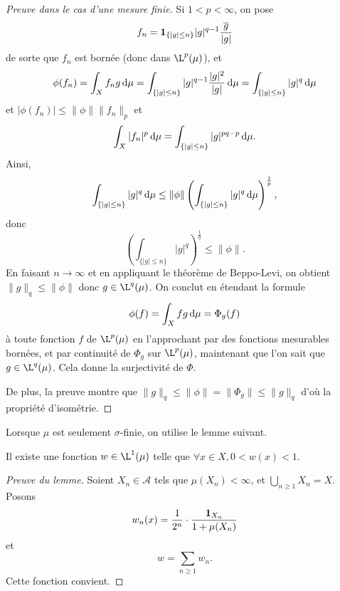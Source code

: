 \begin{proof}[Preuve dans le cas d'une mesure finie]
Si $1<p<\infty$, on pose \[f_n = \bm{1}_{\{|g|\leq n\}} |g|^{q-1} \frac{\overline{g}}{|g|}\] de sorte que  $f_n$ est bornée (donc dans $\L^p(\mu)$), et 
\[ \phi(f_n) =\int_Xf_ng\mathop{}\!\mathrm d\mu = \int_{\{|g|\leq n\}}|g|^{q-1}\frac{|g|^2}{|g|}\mathop{}\!\mathrm d\mu =\int_{\{|g|\leq n\}}|g|^q\mathop{}\!\mathrm d\mu\]
et $|\phi(f_n)|\leq \|\phi\|\|f_n\|_p$ et \[ \int_X |f_n|^p \mathop{}\!\mathrm d\mu = \int_{\{|g|\leq n\}} |g|^{pq-p} \mathop{}\!\mathrm d\mu.\]
Ainsi, \[ \int_{\{|g|\leq n\}} |g|^q \mathop{}\!\mathrm d\mu \leq \|\phi\| \left( \int_{\{|g|\leq n\}} |g|^q \mathop{}\!\mathrm d\mu \right)^{\frac1p},\]
donc \[ \left( \int_{\{|g|\leq n\}} |g|^q\right)^{\frac1q} \leq \|\phi\|.\]
En faisant $n\to \infty$ et en appliquant le théorème de Beppo-Levi, on obtient $\|g\|_q \leq \|\phi\|$ donc $g\in \L^q(\mu)$.
On conclut en étendant la formule \[\phi(f)=\int_X fg\mathop{}\!\mathrm d\mu= \Phi_g(f)\] à toute fonction $f$ de $\L^p(\mu)$ en l'approchant par des fonctions 
mesurables bornées, et par continuité de $\Phi_g$ sur $\L^p(\mu)$, maintenant que l'on sait que $g\in \L^q(\mu)$. Cela donne la surjectivité de $\Phi$.

De plus, la preuve montre que $\|g\|_q \leq \|\phi\|=\|\Phi_g\|\leq \|g\|_q$ d'où la propriété d'isométrie.
\end{proof}

Lorsque $\mu$ est seulement  $\sigma$-finie, on utilise le lemme suivant.

\begin{lmm}
Il existe une fonction $w\in \L^1 (\mu)$ telle que $\forall x\in X, 0<w(x) <1$.
\end{lmm}

\begin{proof}[Preuve du lemme]
Soient $X_n\in \mathcal{A}$ tels que $\mu(X_n) <\infty$, et $\bigcup_{n\geq 1} X_n=X$.
Posons \[w_n(x)= \frac{1}{2^n}\cdot \frac{\bm{1}_{X_n}}{1+\mu(X_n)}\] et \[w=\sum_{n\geq 1} w_n.\]
Cette fonction convient.
\end{proof}

